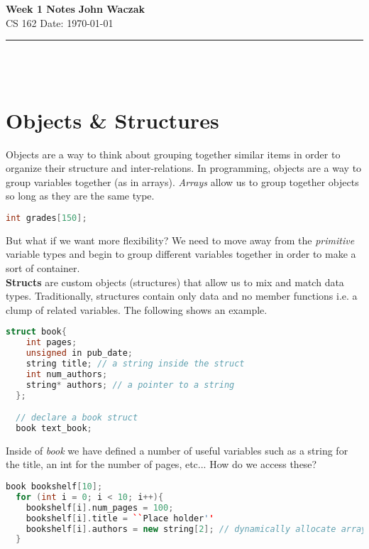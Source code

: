 \documentclass[a4paper, 11pt]{article}
\begin{document}
\noindent
\large\textbf{Week 1 Notes} \hfill \textbf{John Waczak} \\
\normalsize CS 162 \hfill  Date: \today 
\par\noindent\rule{\textwidth}{0.4pt} \\\\


\section*{Objects \& Structures}
Objects are a way to think about grouping together similar items in order to
organize their structure and inter-relations. In programming, objects are a way
to group variables together (as in arrays). \textit{Arrays} allow us to group
together objects so long as they are the same type.

\begin{lstlisting}[language=C++]
  int grades[150]; 
\end{lstlisting}
But what if we want more flexibility? We need to move away from the
\textit{primitive} variable types and begin to group different variables
together in order to make a sort of container.\\ 

\textbf{Structs} are custom objects (structures) that allow us to mix and match
data types. Traditionally, structures contain only data and no member functions
i.e. a clump of related variables. The following shows an example. \\


\begin{lstlisting}[language=C++]
  struct book{
    int pages;
    unsigned in pub_date;
    string title; // a string inside the struct
    int num_authors;
    string* authors; // a pointer to a string
  };

  // declare a book struct
  book text_book; 
\end{lstlisting}
\vspace{1em}

Inside of \textit{book} we have defined a number of useful variables such as a
string for the title, an int for the number of pages, etc... How do we access
these?


\begin{lstlisting}[language=C++]
  book bookshelf[10];
  for (int i = 0; i < 10; i++){
    bookshelf[i].num_pages = 100;
    bookshelf[i].title = ``Place holder''
    bookshelf[i].authors = new string[2]; // dynamically allocate array 
  }
\end{lstlisting}
\end{document}
